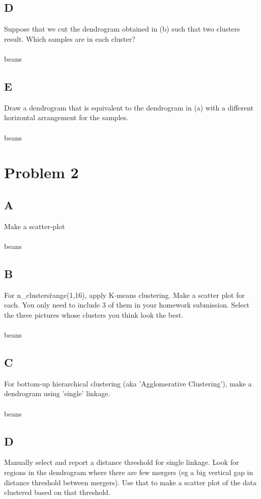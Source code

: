 \documentclass[12pt]{article}
\begin{document}
\subsection{D}
Suppose that we cut the dendrogram obtained in (b) such that two clusters result. Which samples are in each cluster?\\\\
beans


\subsection{E}
Draw a dendrogram that is equivalent to the dendrogram in (a) with a different horizontal arrangement for the samples.\\\\
beans



\section{Problem 2}
\subsection{A}
Make a scatter-plot\\\\
beans


\subsection{B}
For n\_clusters\=range(1,16), apply K-means clustering. Make a scatter plot for each. You only need to include 3 of them in your homework submission. Select the three pictures whose clusters you think look the best.\\\\
beans



\subsection{C}
For bottom-up hierarchical clustering (aka 'Agglomerative Clustering'), make a dendrogram using 'single' linkage.\\\\
beans



\subsection{D}
Manually select and report a distance threshold for single linkage. Look for regions in the dendrogram where there are few mergers (eg a big vertical gap in distance threshold between mergers). Use that to make a scatter plot of the data clustered based on that threshold.\\\\
\end{document}
